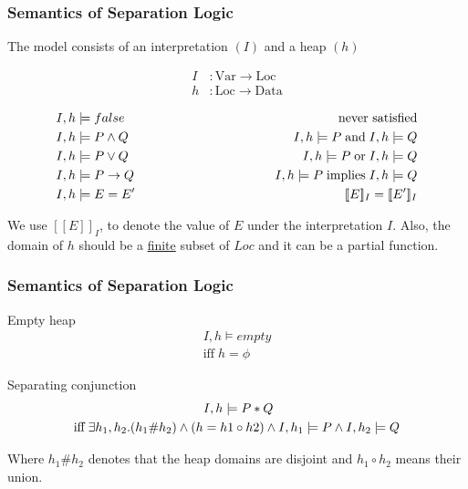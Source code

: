 \documentclass{beamer}
\begin{document}
\begin{frame}
\frametitle{Semantics of Separation Logic}
The model consists of an interpretation $(I)$ and a heap $(h)$

\begin{align*}
    I &: \textrm{Var} \to \textrm{Loc} \\ 
    h &: \textrm{Loc} \to \textrm{Data}
\end{align*}

\begin{align*}
    I,h &\models false \hspace{3.5cm}     & \textrm {never satisfied} \\
    I,h &\models P \land Q \hspace{3.5cm} & I,h \models P \; \textrm{and} \; I,h \models Q \\
    I,h &\models P \lor Q \hspace{3.5cm} & I,h \models P \; \textrm{or} \; I,h \models Q \\
    I,h &\models P \to Q \hspace{3.5cm} & I,h \models P \; \textrm{implies} \; I,h \models Q \\
    I,h &\models E = E' \hspace{3.5cm} & [\![ E ]\!]_I = [\![ E' ]\!]_I
\end{align*}

We use $[\![E]\!]_I$, to denote the value of $E$ under the interpretation $I$. Also, the domain of $h$ should be a \underline{finite} subset of $Loc$ and it can be
a partial function.
\end{frame}

\begin{frame}
\frametitle{Semantics of Separation Logic}

Empty heap
\begin{align*}
    I,h \models empty \\ 
    \textrm{iff} \; h = \phi
\end{align*}

Separating conjunction
\begin{align*}
    I,h \models P * Q \hspace{3.5cm} \\ 
    \textrm{iff} \; \exists h_1,h_2.(h_1 \# h_2) \land (h = h1 \circ h2) \land I,h_1 \models P \land I,h_2 \models Q \\
\end{align*}

Where $h_1 \# h_2$ denotes that the heap domains are disjoint and $h_1 \circ h_2$ means their union. \\
\end{frame}
\end{document}

